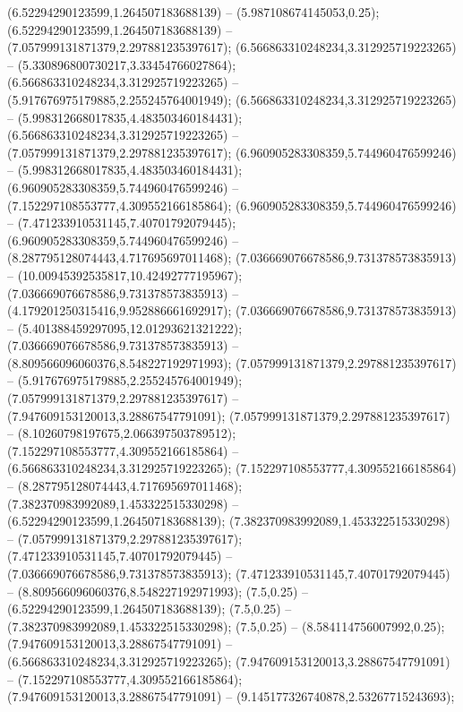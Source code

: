  (6.52294290123599,1.264507183688139) -- (5.987108674145053,0.25);
 (6.52294290123599,1.264507183688139) -- (7.057999131871379,2.297881235397617);
 (6.566863310248234,3.312925719223265) -- (5.330896800730217,3.33454766027864);
 (6.566863310248234,3.312925719223265) -- (5.917676975179885,2.255245764001949);
 (6.566863310248234,3.312925719223265) -- (5.998312668017835,4.483503460184431);
 (6.566863310248234,3.312925719223265) -- (7.057999131871379,2.297881235397617);
 (6.960905283308359,5.744960476599246) -- (5.998312668017835,4.483503460184431);
 (6.960905283308359,5.744960476599246) -- (7.152297108553777,4.309552166185864);
 (6.960905283308359,5.744960476599246) -- (7.471233910531145,7.40701792079445);
 (6.960905283308359,5.744960476599246) -- (8.287795128074443,4.717695697011468);
 (7.036669076678586,9.731378573835913) -- (10.00945392535817,10.42492777195967);
 (7.036669076678586,9.731378573835913) -- (4.179201250315416,9.952886661692917);
 (7.036669076678586,9.731378573835913) -- (5.401388459297095,12.01293621321222);
 (7.036669076678586,9.731378573835913) -- (8.809566096060376,8.548227192971993);
 (7.057999131871379,2.297881235397617) -- (5.917676975179885,2.255245764001949);
 (7.057999131871379,2.297881235397617) -- (7.947609153120013,3.28867547791091);
 (7.057999131871379,2.297881235397617) -- (8.10260798197675,2.066397503789512);
 (7.152297108553777,4.309552166185864) -- (6.566863310248234,3.312925719223265);
 (7.152297108553777,4.309552166185864) -- (8.287795128074443,4.717695697011468);
 (7.382370983992089,1.453322515330298) -- (6.52294290123599,1.264507183688139);
 (7.382370983992089,1.453322515330298) -- (7.057999131871379,2.297881235397617);
 (7.471233910531145,7.40701792079445) -- (7.036669076678586,9.731378573835913);
 (7.471233910531145,7.40701792079445) -- (8.809566096060376,8.548227192971993);
 (7.5,0.25) -- (6.52294290123599,1.264507183688139);
 (7.5,0.25) -- (7.382370983992089,1.453322515330298);
 (7.5,0.25) -- (8.584114756007992,0.25);
 (7.947609153120013,3.28867547791091) -- (6.566863310248234,3.312925719223265);
 (7.947609153120013,3.28867547791091) -- (7.152297108553777,4.309552166185864);
 (7.947609153120013,3.28867547791091) -- (9.145177326740878,2.53267715243693);
